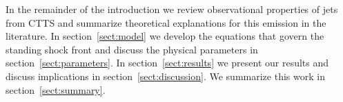 In the remainder of the introduction we review observational properties of jets from CTTS and summarize theoretical explanations for this emission in the literature. In section~\ref{sect:model} we develop the equations that govern the standing shock front and discuss the physical parameters in section~\ref{sect:parameters}. In section~\ref{sect:results} we present our results and discuss implications in section~\ref{sect:discussion}. We summarize this work in section~\ref{sect:summary}.